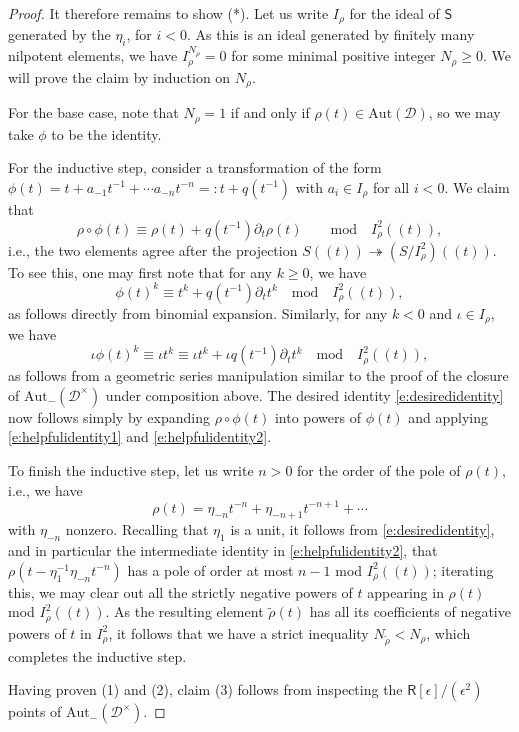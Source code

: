 \documentclass{amsart}
\theoremstyle{definition}
\newcommand{\sD}{\mathscr{D}}
\newcommand{\Sing}{\mathsf{S}}
\newcommand{\on}{\mathrm}
\newcommand{\Ring}{\mathsf{R}}
\newcommand{\Am}{\Aut_-(\pD)}
\newcommand{\pD}{\sD^\times}
\newcommand{\Aut}{\on{Aut}}
\numberwithin{equation}{section}
\begin{document}
\begin{proof}
It therefore remains to show (*). Let us write $I_{\rho}$ for the ideal of $\Sing$ generated by the $\eta_i$, for $i < 0$. As this is an ideal generated by finitely many nilpotent elements, we have $I_\rho^{N_\rho} = 0$ for some minimal positive integer $N_\rho \geqslant 0$.  We will prove the claim by induction on $N_\rho$. 

For the base case, note that $N_\rho = 1$ if and only if $\rho(t) \in \Aut(\sD)$, so we may take $\phi$ to be the identity. 

For the inductive step, consider a transformation of the form $\phi(t) = t + a_{-1}t^{-1} + \cdots a_{-n}t^{-n} =: t + q(t^{-1})$ with $a_i \in I_\rho$ for all $i < 0$.
We claim that 
\begin{equation} \label{e:desiredidentity} \rho \circ \phi(t) \equiv \rho(t) + q(t^{-1})\partial_t \rho(t) \quad \quad \on{mod} \quad I_\rho^2(\!(t)\!),\end{equation}
i.e., the two elements agree after the projection $S(\!(t)\!) \twoheadrightarrow (S/I^2_\rho)(\!(t)\!).$ To see this, one may first note that for any $k \geqslant 0$, we have 
\begin{equation} \label{e:helpfulidentity1} \phi(t)^k \equiv t^k + q(t^{-1}) \partial_t t^k \quad \on{mod} \quad I^2_\rho(\!(t)\!),  \end{equation}
as follows directly from binomial expansion. Similarly, for any $k < 0$ and $\iota \in I_\rho$, we have 
\begin{equation} \label{e:helpfulidentity2} \iota \phi(t)^k \equiv \iota t^k  \equiv \iota t^k + \iota q(t^{-1}) \partial_t t^k \quad \on{mod} \quad I^2_\rho(\!(t)\!),\end{equation}
as follows from a geometric series manipulation similar to the proof of the closure of $\Am$ under composition above. The desired identity \eqref{e:desiredidentity} now follows simply by expanding $\rho \circ \phi(t)$ into powers of $\phi(t)$ and applying \eqref{e:helpfulidentity1} and \eqref{e:helpfulidentity2}. 

To finish the inductive step, let us write $n > 0$ for the order of the pole of $\rho(t)$, i.e., we have  $$\rho(t) = \eta_{-n}t^{-n} + \eta_{-n+1}t^{-n+1} + \cdots$$with $\eta_{-n}$ nonzero. Recalling that $\eta_1$ is a unit, it follows from \eqref{e:desiredidentity}, and in particular the intermediate identity in \eqref{e:helpfulidentity2}, that 
$\rho( t - \eta_1^{-1} \eta_{-n}t^{-n})$ has a pole of order at most $n - 1$ mod $I^2_\rho(\!(t)\!)$; iterating this, we may clear out all the strictly negative powers of $t$ appearing in $\rho(t)$ mod $I^2_\rho(\!(t)\!)$. As the resulting element $\tilde{\rho}(t)$ has all its coefficients of negative powers of $t$ in $I^2_\rho$, it follows that we have a strict inequality $N_{\tilde{\rho}} < N_\rho$, which completes the inductive step. 

Having proven (1) and (2), claim (3) follows from inspecting the $\Ring[\epsilon]/(\epsilon^2)$ points of $\Am$.
\end{proof}
\end{document}
